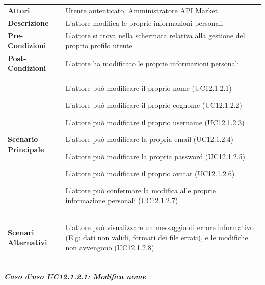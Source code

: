 \begin{tabular}{ l | p{11cm}}
	\hline
	\rowcolor{Gray}
	\multicolumn{2}{c}{UC12.1.2 - Modifica informazioni personali} \\
	\hline
	\textbf{Attori} & Utente autenticato, Amministratore API Market \\
	\textbf{Descrizione} & L'attore modifica le proprie informazioni personali \\
	\textbf{Pre-Condizioni} & L'attore si trova nella schermata relativa alla gestione del proprio profilo utente \\
	\textbf{Post-Condizioni} & L'attore ha modificato le proprie informazioni personali \\
	\textbf{Scenario Principale} & 
	\begin{enumerate*}[label=(\arabic*.),itemjoin={\newline}]
		\item L'attore può modificare il proprio nome (UC12.1.2.1)
		\item L'attore può modificare il proprio cognome (UC12.1.2.2)
		\item L'attore può modificare il proprio username (UC12.1.2.3)
		\item L'attore può modificare la propria email (UC12.1.2.4)
		\item L'attore può modificare la propria password (UC12.1.2.5)
		\item L'attore può modificare il proprio avatar (UC12.1.2.6)
		\item L'attore può confermare la modifica alle proprie informazione personali (UC12.1.2.7)
	\end{enumerate*}\\
	\textbf{Scenari Alternativi} & 
	\begin{enumerate*}[label=(\arabic*.),itemjoin={\newline}]
		\item L'attore può visualizzare un messaggio di errore informativo (E.g: dati non validi, formati dei file errati), e le modifiche non avvengono (UC12.1.2.8)
	\end{enumerate*}\\
\end{tabular}

\subparagraph{Caso d'uso UC12.1.2.1: Modifica nome}
\label{UC12_1_2_1}

